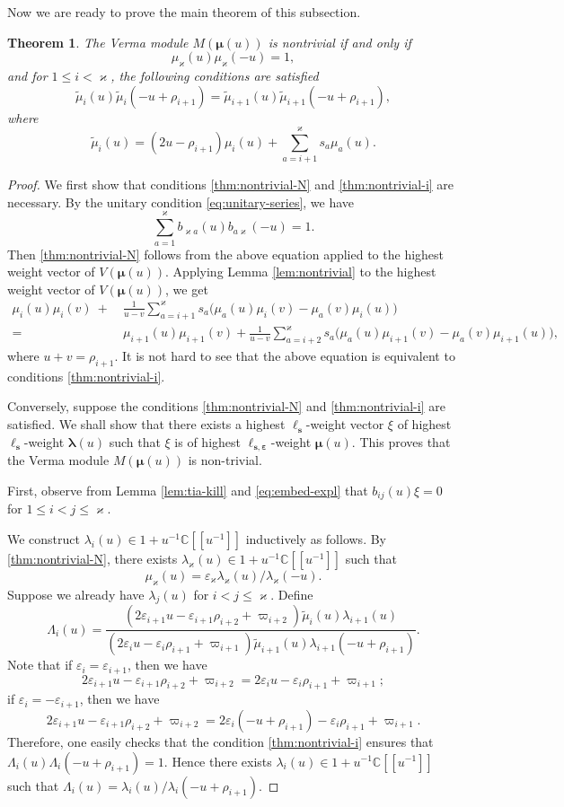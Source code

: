 \documentclass[11pt,reqno]{amsart}
\numberwithin{equation}{section}
\newtheorem{thm}{Theorem}[section]
\theoremstyle{definition}
\theoremstyle{remark}
\newcommand{\beq}{\begin{equation}}
\newcommand{\eeq}{\end{equation}}
\newcommand{\C}{\mathbb{C}}
\newcommand{\tl}{\tilde}
\newcommand{\lle}{\leqslant}
\newcommand{\la}{\lambda}
\newcommand{\La}{\Lambda}
\newcommand{\bla}{\bm\lambda}
\newcommand{\ka}{\varkappa}
\newcommand{\ve}{\varepsilon}
\newcommand{\s}{{\bm s}}
\begin{document}
Now we are ready to prove the main theorem of this subsection.
\begin{thm}\label{thmnontrivial}
The Verma module $M(\bm\mu(u))$ is nontrivial if and only if
\beq\label{thm:nontrivial-N}
\mu_\ka(u)\mu_{\ka}(-u)=1,
\eeq
and for $1\lle i < \ka$, the following conditions are satisfied
\beq\label{thm:nontrivial-i}
\tilde \mu_i(u)\tilde\mu_i(-u+\rho_{i+1})=\tilde \mu_{i+1}(u)\tilde\mu_{i+1}(-u+\rho_{i+1}),
\eeq
where
\beq\label{eq:mu-tilde}
\tilde \mu_i(u)=(2u-\rho_{i+1})\mu_i(u)+\sum_{a=i+1}^\ka s_a\mu_a(u).
\eeq
\end{thm}
\begin{proof}
We first show that conditions \eqref{thm:nontrivial-N} and \eqref{thm:nontrivial-i} are necessary. By the unitary condition \eqref{eq:unitary-series}, we have
\[
\sum_{a=1}^\ka b_{\ka a}(u)b_{a\ka}(-u)=1.
\]
Then \eqref{thm:nontrivial-N} follows from the above equation applied to the highest weight vector of $V(\bm\mu(u))$. Applying Lemma \ref{lem:nontrivial} to the highest weight vector of $V(\bm\mu(u))$, we get
\begin{align*}
\mu_i(u)\mu_i(v)\ +&\ \frac{1}{u-v}\sum_{a=i+1}^\ka s_a\big(\mu_a(u)\mu_i(v)-\mu_a(v)\mu_i(u)\big)\\
= &\
\mu_{i+1}(u)\mu_{i+1}(v)+\frac{1}{u-v}\sum_{a=i+2}^\ka s_a\big(\mu_{a}(u)\mu_{i+1}(v)-\mu_{a}(v)\mu_{i+1}(u)\big),
\end{align*}
where $u+v=\rho_{i+1}$. It is not hard to see that the above equation is equivalent to conditions \eqref{thm:nontrivial-i}.

Conversely, suppose the conditions \eqref{thm:nontrivial-N} and \eqref{thm:nontrivial-i} are satisfied. We shall show that there exists a highest $\ell_\s$-weight vector $\xi$ of highest $\ell_\s$-weight $\bla(u)$ such that $\xi$ is of highest $\ell_{\s,\bm\ve}$-weight $\bm\mu(u)$. This proves that the Verma module $M(\bm\mu(u))$ is non-trivial.

First, observe from Lemma \ref{lem:tia-kill} and \eqref{eq:embed-expl} that $b_{ij}(u)\xi =0$ for $1\lle i<j\lle \ka$.

We construct $\la_i(u)\in 1+u^{-1}\C[[u^{-1}]]$ inductively as follows. By \eqref{thm:nontrivial-N}, there exists $\la_\ka(u)\in 1+u^{-1}\C[[u^{-1}]]$ such that
$$
\mu_\ka(u)=\ve_\ka \la_\ka(u)/\la_\ka(-u).
$$
Suppose we already have $\la_j(u)$ for $i<j\lle \ka$. Define
\[
\La_i(u)=\frac{(2\ve_{i+1}u-\ve_{i+1}\rho_{i+2}+\varpi_{i+2})\tl \mu_i(u)\la_{i+1}(u)}{(2\ve_{i}u-\ve_{i}\rho_{i+1}+\varpi_{i+1})\tl \mu_{i+1}(u)\la_{i+1}(-u+\rho_{i+1})}.
\]
Note that if $\ve_i=\ve_{i+1}$, then we have
\beq\label{eq:good1}
2\ve_{i+1}u-\ve_{i+1}\rho_{i+2}+\varpi_{i+2}=2\ve_{i}u-\ve_{i}\rho_{i+1}+\varpi_{i+1};
\eeq
if $\ve_i=-\ve_{i+1}$, then we have
\beq\label{eq:good2}
2\ve_{i+1}u-\ve_{i+1}\rho_{i+2}+\varpi_{i+2}=2\ve_{i}(-u+\rho_{i+1})-\ve_{i}\rho_{i+1}+\varpi_{i+1}.
\eeq
Therefore, one easily checks that the condition \eqref{thm:nontrivial-i}
ensures that $\La_i(u)\La_{i}(-u+\rho_{i+1})=1$. Hence there exists $\la_i(u)\in 1+u^{-1}\C[[u^{-1}]]$ such that $\La_i(u)=\la_i(u)/\la_i(-u+\rho_{i+1})$.


\end{proof}
\end{document}
